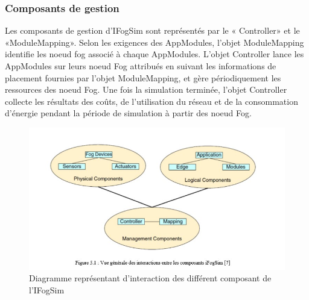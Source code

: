 \subsubsection{Composants de gestion}
Les composants de gestion d’IFogSim sont représentés par le « Controller» et le «ModuleMapping». Selon les exigences des AppModules, l'objet ModuleMapping identifie les noeud fog associé à chaque AppModules. L'objet Controller lance les AppModules sur leurs noeud Fog attribués en suivant les informations de placement fournies par l'objet ModuleMapping, et gère périodiquement les ressources des noeud Fog. Une fois la simulation terminée, l'objet Controller collecte les résultats des coûts, de l'utilisation du réseau et de la consommation d'énergie pendant la période de simulation à partir des noeud Fog.
\begin{figure}[H]
    \centering
    \includegraphics[]{src/ressources/Diagramme d'interaction.jpg}
    \caption{Diagramme représentant d'interaction des différent composant de l'IFogSim}
    \label{fig:}
\end{figure}
